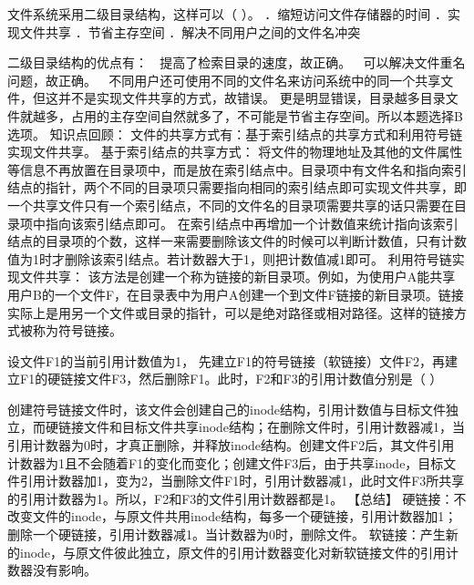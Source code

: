 \question 文件系统采用二级目录结构，这样可以（ ）。 ．缩短访问文件存储器的时间
．实现文件共享 ．节省主存空间 ．解决不同用户之间的文件名冲突
\par{}
\begin{solution}二级目录结构的优点有：  提高了检索目录的速度，故正确。 
可以解决文件重名问题，故正确。 
不同用户还可使用不同的文件名来访问系统中的同一个共享文件，但这并不是实现文件共享的方式，故错误。
更是明显错误，目录越多目录文件就越多，占用的主存空间自然就多了，不可能是节省主存空间。所以本题选择B选项。
知识点回顾：
文件的共享方式有：基于索引结点的共享方式和利用符号链实现文件共享。
基于索引结点的共享方式：
将文件的物理地址及其他的文件属性等信息不再放置在目录项中，而是放在索引结点中。目录项中有文件名和指向索引结点的指针，两个不同的目录项只需要指向相同的索引结点即可实现文件共享，即一个共享文件只有一个索引结点，不同的文件名的目录项需要共享的话只需要在目录项中指向该索引结点即可。
在索引结点中再增加一个计数值来统计指向该索引结点的目录项的个数，这样一来需要删除该文件的时候可以判断计数值，只有计数值为1时才删除该索引结点。若计数器大于1，则把计数值减1即可。
利用符号链实现文件共享：
该方法是创建一个称为链接的新目录项。例如，为使用户A能共享用户B的一个文件F，在目录表中为用户A创建一个到文件F链接的新目录项。链接实际上是用另一个文件或目录的指针，可以是绝对路径或相对路径。这样的链接方式被称为符号链接。
\end{solution}
\question 设文件F1的当前引用计数值为1，
先建立F1的符号链接（软链接）文件F2，再建立F1的硬链接文件F3，然后删除F1。此时，F2和F3的引用计数值分别是（
）
\par{}
\begin{solution}创建符号链接文件时，该文件会创建自己的inode结构，引用计数值与目标文件独立，而硬链接文件和目标文件共享inode结构；在删除文件时，引用计数器减1，当引用计数器为0时，才真正删除，并释放inode结构。创建文件F2后，其文件引用计数器为1且不会随着F1的变化而变化；创建文件F3后，由于共享inode，目标文件引用计数器加1，变为2，当删除文件F1时，引用计数器减1，此时文件F3所共享的引用计数器为1。所以，F2和F3的文件引用计数器都是1。
【总结】
硬链接：不改变文件的inode，与原文件共用inode结构，每多一个硬链接，引用计数器加1；删除一个硬链接，引用计数器减1。当计数器为0时，删除文件。
软链接：产生新的inode，与原文件彼此独立，原文件的引用计数器变化对新软链接文件的引用计数器没有影响。
\end{solution}
